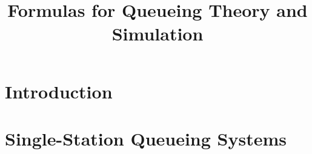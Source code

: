 \documentclass{book}
\title{Formulas for Queueing Theory and Simulation}
\begin{document}
\maketitle

\tableofcontents


\chapter{Introduction}\label{sec:introduction}

%
%
%

\chapter{Single-Station Queueing Systems}

%
% 
%
%
%
%
%
%
%
%
% 
%

%
% 
%
%
%
%
%
%
%
%
%
%
%
%




\cleardoublepage
{}
{}
\printindex

% 
% 
\end{document}
